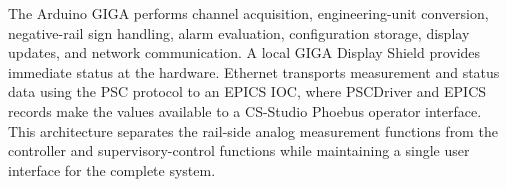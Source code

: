 The Arduino GIGA performs channel acquisition, engineering-unit conversion,
negative-rail sign handling, alarm evaluation, configuration storage, display
updates, and network communication. A local GIGA Display Shield provides
immediate status at the hardware. Ethernet transports measurement and status
data using the PSC protocol to an EPICS IOC, where PSCDriver and EPICS records
make the values available to a CS-Studio Phoebus operator interface. This
architecture separates the rail-side analog measurement functions from the
controller and supervisory-control functions while maintaining a single user
interface for the complete system.